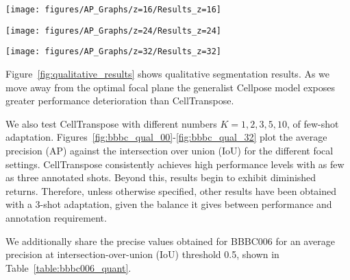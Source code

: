 \begin{figure*}
\centering
\texttt{[image: figures/AP\_Graphs/z=16/Results\_z=16]}
\caption{\textbf{Results on BBBC006 at z=16 (in-focus).} Average precision of $K$-shot adaptation with $K= 1, 2, 3, 5, 10$ target samples, compared with the original Cellpose pretrained model.}
\label{fig:bbbc_qual_16}
\end{figure*}

\begin{figure*}
\centering
\texttt{[image: figures/AP\_Graphs/z=24/Results\_z=24]}
\caption{\textbf{Results on BBBC006 at z=24.} Average precision of $K$-shot adaptation with $K= 1, 2, 3, 5, 10$ target samples, compared with the original Cellpose pretrained model.}
\label{fig:bbbc_qual_24}
\end{figure*}

\begin{figure*}
\centering
\texttt{[image: figures/AP\_Graphs/z=32/Results\_z=32]}
\caption{\textbf{Results on BBBC006 at z=32.} Average precision of $K$-shot adaptation with $K= 1, 2, 3, 5, 10$ target samples, compared with the original Cellpose pretrained model.}
\label{fig:bbbc_qual_32}
\end{figure*}

Figure~\ref{fig:qualitative_results} shows qualitative segmentation results. As we move away from the optimal focal plane the generalist Cellpose model exposes greater performance deterioration than CellTranspose.

We also test CellTranspose with different numbers $K= 1, 2, 3, 5, 10$, of few-shot adaptation. Figures~\ref{fig:bbbc_qual_00}-\ref{fig:bbbc_qual_32} plot the average precision (AP) against the intersection over union (IoU) for the different focal settings. CellTranspose consistently achieves high performance levels with as few as three annotated shots. Beyond this, results begin to exhibit diminished returns. Therefore, unless otherwise specified, other results have been obtained with a 3-shot adaptation, given the balance it gives between performance and annotation requirement.

We additionally share the precise values obtained for BBBC006 for an average precision at intersection-over-union (IoU) threshold 0.5, shown in Table~\ref{table:bbbc006_quant}.





